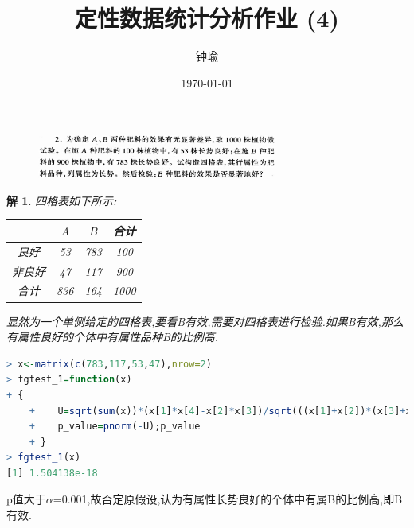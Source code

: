 \documentclass[11pt,a4paper]{ctexart}
\title{定性数据统计分析作业 (4)}
\author{钟瑜 \quad 222018314210044}
\date{\today}
\newtheorem*{solution}{解}
\begin{document}
\maketitle
\pagestyle{plain}%
\begin{figure}[H]
	\includegraphics[width=0.7\textwidth]{1.png}
\end{figure}
\begin{solution}
四格表如下所示:
\begin{table}[!htbp]   %
	\centering
	\begin{tabular}{cccc}
		\toprule[1.5pt]
		 & $ A $  & $ B $ & 合计\\
		\midrule[1pt]
		良好& 53 & 783 & 100\\
		非良好 & 47  & 117 & 900\\
		\midrule[1pt]
		合计 & 836 & 164 & 1000\\
		\bottomrule[1.5pt]
	\end{tabular}
\end{table}
显然为一个单侧给定的四格表,要看B有效,需要对四格表进行检验.如果B有效,那么有属性良好的个体中有属性品种B的比例高.

\end{solution}

\begin{lstlisting}[language=r]
> x<-matrix(c(783,117,53,47),nrow=2)
> fgtest_1=function(x)
+ {
	+    U=sqrt(sum(x))*(x[1]*x[4]-x[2]*x[3])/sqrt(((x[1]+x[2])*(x[3]+x[4])*(x[1]+x[3])*(x[2]+x[4])))  #卡方统计量
	+ 	 p_value=pnorm(-U);p_value
	+ }
> fgtest_1(x)
[1] 1.504138e-18
\end{lstlisting}
p值大于$ \alpha $=0.001,故否定原假设,认为有属性长势良好的个体中有属B的比例高,即B有效.\\
\end{document}
